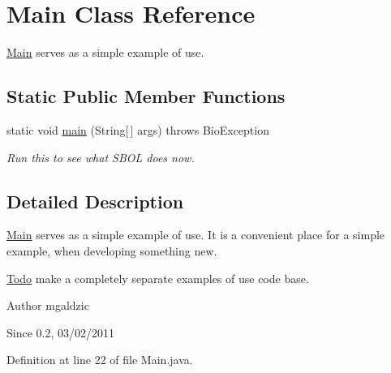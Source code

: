 \hypertarget{classlib_s_b_o_lj_use_example_1_1_main}{
\section{Main Class Reference}
\label{classlib_s_b_o_lj_use_example_1_1_main}
}


\hyperlink{classlib_s_b_o_lj_use_example_1_1_main}{Main} serves as a simple example of use.  


\subsection*{Static Public Member Functions}
\begin{DoxyCompactItemize}
\item 
static void \hyperlink{classlib_s_b_o_lj_use_example_1_1_main_a8b260eecbaabcef8473fd87ada040682}{main} (String\mbox{[}$\,$\mbox{]} args)  throws BioException 
\begin{DoxyCompactList}\small\item\em Run this to see what SBOL does now. \item\end{DoxyCompactList}\end{DoxyCompactItemize}


\subsection{Detailed Description}
\hyperlink{classlib_s_b_o_lj_use_example_1_1_main}{Main} serves as a simple example of use. It is a convenient place for a simple example, when developing something new. \begin{Desc}
\item[\hyperlink{todo__todo000012}{Todo}]make a completely separate examples of use code base.\end{Desc}


\begin{DoxyAuthor}{Author}
mgaldzic 
\end{DoxyAuthor}
\begin{DoxySince}{Since}
0.2, 03/02/2011 
\end{DoxySince}


Definition at line 22 of file Main.java.



